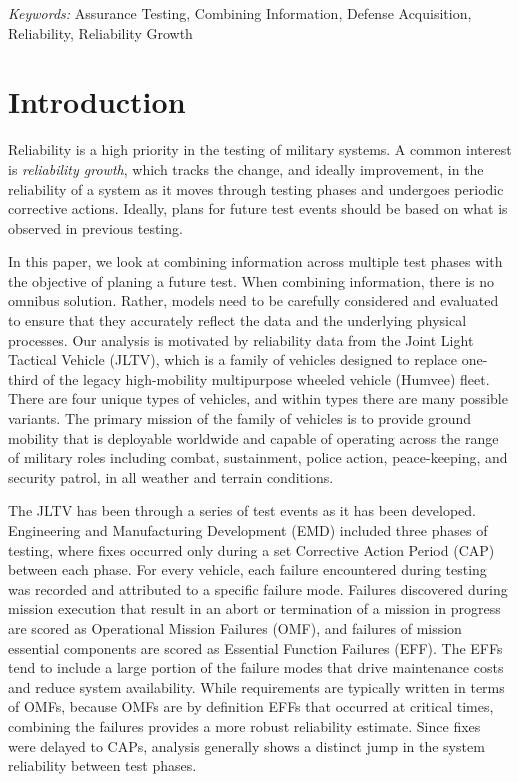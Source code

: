 \documentclass[12pt]{article}
\begin{document}
\noindent%
{\it Keywords:}  Assurance Testing, Combining Information, Defense Acquisition, Reliability, Reliability Growth
\vfill

\newpage

\section{Introduction}

Reliability is a high priority in the testing of military systems. A common interest is {\em reliability growth}, which tracks the change, and ideally improvement, in the reliability of a system as it moves through testing phases and undergoes periodic corrective actions. Ideally, plans for future test events should be based on what is observed in previous testing.

In this paper, we look at combining information across multiple test phases with the objective of planing a future test. When combining information, there is no omnibus solution. Rather, models need to be carefully considered and evaluated to ensure that they accurately reflect the data and the underlying physical processes. Our analysis is motivated by reliability data from the Joint Light Tactical Vehicle (JLTV), which is a family of vehicles designed to replace one-third of the legacy high-mobility multipurpose wheeled vehicle (Humvee) fleet. There are four unique types of vehicles, and within types there are many possible variants. The primary mission of the family of vehicles is to provide ground mobility that is deployable worldwide and capable of operating across the range of military roles including combat, sustainment, police action, peace-keeping, and security patrol, in all weather and terrain conditions.

The JLTV has been through a series of test events as it has been developed. Engineering and Manufacturing Development (EMD) included three phases of testing, where fixes occurred only during a set Corrective Action Period (CAP) between each phase. For every vehicle, each failure encountered during testing was recorded and attributed to a specific failure mode. Failures discovered during mission execution that result in an abort or termination of a mission in progress are scored as Operational Mission Failures (OMF), and failures of mission essential components are scored as Essential Function Failures (EFF). The EFFs tend to include a large portion of the failure modes that drive maintenance costs and reduce system availability. While requirements are typically written in terms of OMFs, because OMFs are by definition EFFs that occurred at critical times, combining the failures provides a more robust reliability estimate. Since fixes were delayed to CAPs, analysis generally shows a distinct jump in the system reliability between test phases.
\end{document}
